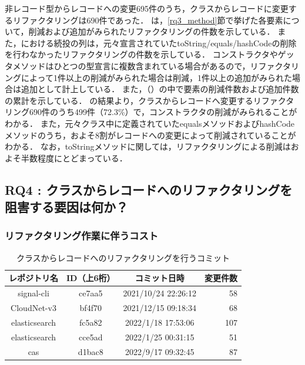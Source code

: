 非レコード型からレコードへの変更695件のうち，クラスからレコードに変更するリファクタリングは690件であった．
は，\ref{rq3_method}節で挙げた各要素について，削減および追加がみられたリファクタリングの件数を示している．
また，における続投の列は，元々宣言されていたtoString/equals/hashCodeの削除を行わなかったリファクタリングの件数を示している．
コンストラクタやゲッタメソッドはひとつの型宣言に複数含まれている場合があるので，リファクタリングによって1件以上の削減がみられた場合は削減，1件以上の追加がみられた場合は追加として計上している．
また，（）の中で要素の削減件数および追加件数の累計を示している．
の結果より，クラスからレコードへ変更するリファクタリング690件のうち499件（72.3\%）で，コンストラクタの削減がみられることがわかる．
また，元々クラス中に定義されていたequalsメソッドおよびhashCodeメソッドのうち，およそ8割がレコードへの変更によって削減されていることがわかる．
なお，toStringメソッドに関しては，リファクタリングによる削減はおよそ半数程度にとどまっている．

\subsection{RQ4 : クラスからレコードへのリファクタリングを阻害する要因は何か？\label{rq4_result}}

\subsubsection{リファクタリング作業に伴うコスト}

\begin{table}[t]
    \caption{クラスからレコードへのリファクタリングを行うコミット}
    \label{refactoring_commits}
    \centering
    \begin{tabular}{c|c|c|r}
        \hline
        レポジトリ名 & ID（上6桁）& コミット日時 & 変更件数\\
        \hline\hline
        signal-cli & ce7aa5 & 2021/10/24 22:26:12 & 58\\
        CloudNet-v3 & bf4f70 & 2021/12/15 09:18:34 & 68\\
        elasticsearch & fc5a82 & 2022/1/18 17:53:06 & 107\\
        elasticsearch & cce5ad & 2022/1/25 00:31:15 & 51\\
        cas & d1bac8 & 2022/9/17 09:32:45 & 87\\
        \hline
    \end{tabular}
\end{table}

